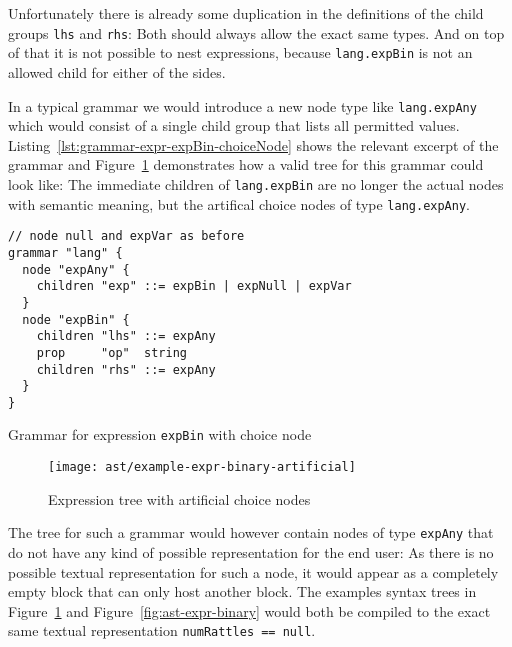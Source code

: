 \documentclass[sigconf,natbib=false]{acmart}
\newcommand\astScale{0.7}
\begin{document}
Unfortunately there is already some duplication in the definitions of the child groups \texttt{lhs} and \texttt{rhs}: Both should always allow the exact same types. And on top of that it is not possible to nest expressions, because \texttt{lang.expBin} is not an allowed child for either of the sides.

In a typical grammar we would introduce a new node type like \texttt{lang.expAny} which would consist of a single child group that lists all permitted values. Listing~\ref{lst:grammar-expr-expBin-choiceNode} shows the relevant excerpt of the grammar and Figure~\ref{fig:ast-choice-node} demonstrates how a valid tree for this grammar could look like: The immediate children of \texttt{lang.expBin} are no longer the actual nodes with semantic meaning, but the artifical choice nodes of type \texttt{lang.expAny}.

\begin{listing}[H]
\begin{verbatim}
// node null and expVar as before
grammar "lang" {
  node "expAny" {
    children "exp" ::= expBin | expNull | expVar
  }
  node "expBin" {
    children "lhs" ::= expAny
    prop     "op"  string
    children "rhs" ::= expAny
  }
}
\end{verbatim}
\caption{Grammar for expression \texttt{expBin} with choice node}
\label{lst:grammar-expr-expBin-choiceNode}
\end{listing}

\begin{figure}
  \texttt{[image: ast/example-expr-binary-artificial]}
  \caption{Expression tree with artificial choice nodes}
  \label{fig:ast-choice-node}
\end{figure}

The tree for such a grammar would however contain nodes of type \texttt{expAny} that do not have any kind of possible representation for the end user: As there is no possible textual representation for such a node, it would appear as a completely empty block that can only host another block. The examples syntax trees in Figure~\ref{fig:ast-choice-node} and Figure~\ref{fig:ast-expr-binary} would both be compiled to the exact same textual representation \texttt{numRattles == null}.
\end{document}

